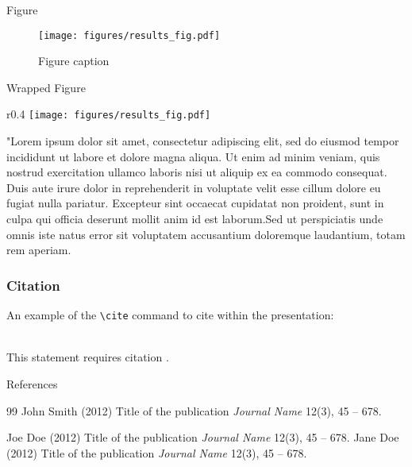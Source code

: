 \documentclass[aspectratio=169,xcolor=dvipsnames, t]{beamer}
\begin{document}
\begin{frame}{Figure}
    \begin{figure}
    \texttt{[image: figures/results\_fig.pdf]}
    \caption{Figure caption}
    \end{figure}
\end{frame}

\begin{frame}{Wrapped Figure}
    \begin{wrapfigure}{r}{0.4\textwidth}
    \centering
    \texttt{[image: figures/results\_fig.pdf]}
    \caption{Figure caption}
\end{wrapfigure}
"Lorem ipsum dolor sit amet, consectetur adipiscing elit, sed do eiusmod tempor incididunt ut labore et dolore magna aliqua. Ut enim ad minim veniam, quis nostrud exercitation ullamco laboris nisi ut aliquip ex ea commodo consequat. Duis aute irure dolor in reprehenderit in voluptate velit esse cillum dolore eu fugiat nulla pariatur. Excepteur sint occaecat cupidatat non proident, sunt in culpa qui officia deserunt mollit anim id est laborum.Sed ut perspiciatis unde omnis iste natus error sit voluptatem accusantium doloremque laudantium, totam rem aperiam.
\end{frame}

\begin{frame}[fragile] %
    \frametitle{Citation}
    An example of the \verb|\cite| command to cite within the presentation:\\~

    This statement requires citation \cite{p1}.
\end{frame}

\begin{frame}{References}
    \footnotesize{
        \begin{thebibliography}{99}
             John Smith (2012)
            \newblock Title of the publication
            \newblock \emph{Journal Name} 12(3), 45 -- 678.

             Joe Doe (2012)
            \newblock Title of the publication
            \newblock \emph{Journal Name} 12(3), 45 -- 678.
             Jane Doe (2012)
            \newblock Title of the publication
            \newblock \emph{Journal Name} 12(3), 45 -- 678.
        \end{thebibliography}
    }
\end{frame}
\end{document}
